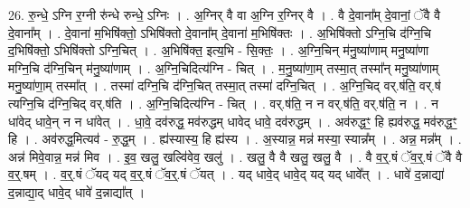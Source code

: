 \documentclass[17pt]{extarticle}
\begin{document}
26. रु॒न्धे॒ ऽग्नि र॒ग्नी रु॑न्धे रुन्धे॒ ऽग्निः । . अ॒ग्निर् वै वा अ॒ग्नि र॒ग्निर् वै । . वै दे॒वाना᳚म् दे॒वानां॒ ॅवै वै दे॒वाना᳚म् । . दे॒वाना॑ म॒भिषि॑क्तो॒ ऽभिषि॑क्तो दे॒वाना᳚म् दे॒वाना॑ म॒भिषि॑क्तः । . अ॒भिषि॑क्तो ऽग्नि॒चि द॑ग्नि॒चि द॒भिषि॑क्तो॒ ऽभिषि॑क्तो ऽग्नि॒चित् । . अ॒भिषि॑क्त॒ इत्य॒भि - सि॒क्तः॒ । . अ॒ग्नि॒चिन् म॑नु॒ष्या॑णाम् मनु॒ष्या॑णा मग्नि॒चि द॑ग्नि॒चिन् म॑नु॒ष्या॑णाम् । . अ॒ग्नि॒चिदित्य॑ग्नि - चित् । . म॒नु॒ष्या॑णा॒म् तस्मा॒त् तस्मा᳚न् मनु॒ष्या॑णाम् मनु॒ष्या॑णा॒म् तस्मा᳚त् । . तस्मा॑ दग्नि॒चि द॑ग्नि॒चित् तस्मा॒त् तस्मा॑ दग्नि॒चित् । . अ॒ग्नि॒चिद् वर्.ष॑ति॒ वर्.ष॑ त्यग्नि॒चि द॑ग्नि॒चिद् वर्.ष॑ति । . अ॒ग्नि॒चिदित्य॑ग्नि - चित् । . वर्.ष॑ति॒ न न वर्.ष॑ति॒ वर्.ष॑ति॒ न । . न धा॑वेद् धावे॒न् न न धा॑वेत् । . धा॒वे॒ दव॑रुद्ध॒ मव॑रुद्धम् धावेद् धावे॒ दव॑रुद्धम् । . अव॑रुद्धꣳ॒॒ हि ह्यव॑रुद्ध॒ मव॑रुद्धꣳ॒॒ हि । . अव॑रुद्ध॒मित्यव॑ - रु॒द्ध॒म् । . ह्य॑स्यास्य॒ हि ह्य॑स्य । . अ॒स्यान्न॒ मन्न॑ मस्या॒ स्यान्न᳚म् । . अन्न॒ मन्न᳚म् । . अन्न॑ मिवे॒वान्न॒ मन्न॑ मिव । . इ॒व॒ खलु॒ खल्वि॑वेव॒ खलु॑ । . खलु॒ वै वै खलु॒ खलु॒ वै । . वै व॒र्॒.षं ॅव॒र्॒.षं ॅवै वै व॒र्॒.षम् । . व॒र्॒.षं ॅयद् यद् व॒र्॒.षं ॅव॒र्॒.षं ॅयत् । . यद् धावे॒द् धावे॒द् यद् यद् धावे᳚त् । . धावे॑ द॒न्नाद्या॑ द॒न्नाद्या॒द् धावे॒द् धावे॑ द॒न्नाद्या᳚त् । \newline
\end{document}
